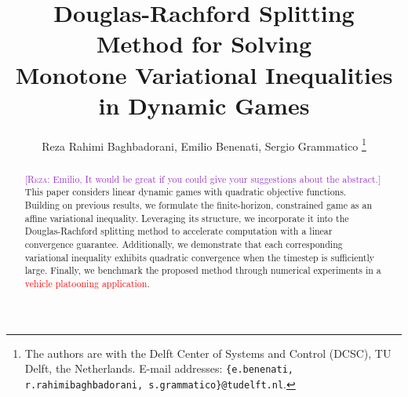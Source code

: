 \documentclass[letterpaper, 10 pt, conference]{ieeeconf}  %
\title{\LARGE \bf
Douglas-Rachford Splitting Method for Solving \\
Monotone Variational Inequalities in Dynamic Games
}
\author{Reza Rahimi Baghbadorani, Emilio Benenati, Sergio Grammatico %
\thanks{The authors are with the Delft Center of Systems and
Control (DCSC), TU Delft, the Netherlands. E-mail addresses:
{\tt\small \{e.benenati, r.rahimibaghbadorani, s.grammatico\}@tudelft.nl}.}%
}
\newcommand{\rezasay}[1]{\textcolor{DarkOrchid}{[\textsc{Reza:} #1]}}
\newcommand{\red}[1]{\textcolor{red}{#1}}
\begin{document}
\maketitle
\thispagestyle{empty}
\pagestyle{empty}


\begin{abstract}
\rezasay{Emilio, It would be great if you could give your suggestions about the abstract.}
This paper considers linear dynamic games with quadratic objective functions. Building on previous results, we formulate the finite-horizon, constrained game as an affine variational inequality. Leveraging its structure, we incorporate it into the Douglas-Rachford splitting method to accelerate computation with a linear convergence guarantee. Additionally, we demonstrate that each corresponding variational inequality exhibits quadratic convergence when the timestep is sufficiently large. Finally, we benchmark the proposed method through numerical experiments in a \red{vehicle platooning application}.
\end{abstract}
\end{document}
